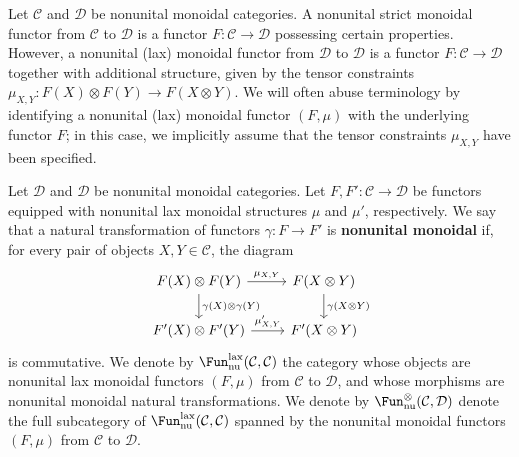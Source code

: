 \begin{remark}
Let $\mathcal{C}$ and $\mathcal{D}$ be nonunital monoidal categories. A nonunital strict monoidal functor from $\mathcal{C}$ to $\mathcal{D}$ is a functor $F:\mathcal{C}\to\mathcal{D}$ possessing certain properties. However, a nonunital (lax) monoidal functor from $\mathcal{D}$ to $\mathcal{D}$ is a functor $F:\mathcal{C}\to\mathcal{D}$ together with additional structure, given by the tensor constraints $\mu_{X,Y}:F(X)\otimes F(Y)\to F(X\otimes Y)$. We will often abuse terminology by identifying a nonunital (lax) monoidal functor $(F,\mu)$ with the underlying functor $F$; in this case, we implicitly assume that the tensor constraints $\mu_{X,Y}$ have been specified.
\end{remark}
Let $\mathcal{D}$ and $\mathcal{D}$ be nonunital monoidal categories. Let $F,F':\mathcal{C}\to\mathcal{D}$ be functors equipped with nonunital lax monoidal structures $\mu$ and $\mu'$, respectively. We say that a natural transformation of functors $\gamma:F\to F'$ is \textbf{nonunital monoidal} if, for every pair of objects $X,Y\in\mathcal{C}$, the diagram
\[\begin{tikzcd}
F(X)\otimes F(Y)\ar[d,"\gamma(X)\otimes\gamma(Y)"]\ar[r,"\mu_{X,Y}"]&F(X\otimes Y)\ar[d,"\gamma(X\otimes Y)"]\\
F'(X)\otimes F'(Y)\ar[r,"\mu'_{X,Y}"]&F'(X\otimes Y)
\end{tikzcd}\]
is commutative. We denote by $\Fun^{\mathrm{lax}}_{\mathrm{nu}}(\mathcal{C},\mathcal{C})$ the category whose objects are nonunital lax monoidal functors $(F,\mu)$ from $\mathcal{C}$ to $\mathcal{D}$, and whose morphisms are nonunital monoidal natural transformations. We denote by $\Fun_{\mathrm{nu}}^{\otimes}(\mathcal{C},\mathcal{D})$ denote the full subcategory of $\Fun^{\mathrm{lax}}_{\mathrm{nu}}(\mathcal{C},\mathcal{C})$ spanned by the nonunital monoidal functors $(F,\mu)$ from $\mathcal{C}$ to $\mathcal{D}$.
